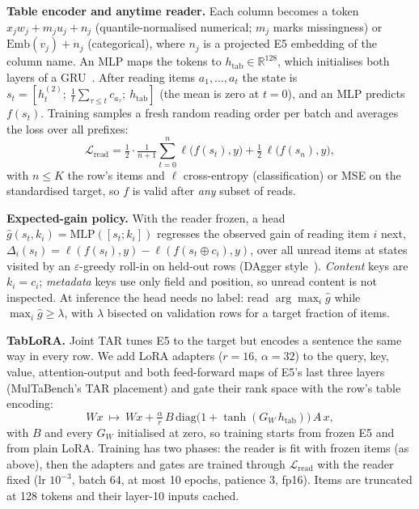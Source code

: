 \documentclass{article}
\newcommand{\htab}{h_{\mathrm{tab}}}
\begin{document}
\textbf{Table encoder and anytime reader.}
Each column becomes a token $x_jw_j+m_ju_j+n_j$ (quantile-normalised numerical; $m_j$ marks missingness) or $\mathrm{Emb}(v_j)+n_j$ (categorical), where $n_j$ is a projected E5 embedding of the column name.
An MLP maps the tokens to $\htab\in\mathbb{R}^{128}$, which initialises both layers of a GRU~\cite{cho2014gru}.
After reading items $a_1,\dots,a_t$ the state is $s_t=[h^{(2)}_t;\ \tfrac1t\sum_{\tau\le t}c_{a_\tau};\ \htab]$ (the mean is zero at $t=0$), and an MLP predicts $f(s_t)$.
Training samples a fresh random reading order per batch and averages the loss over all prefixes:
\begin{equation}
\mathcal{L}_{\text{read}}=\tfrac12\cdot\tfrac{1}{n+1}\textstyle\sum_{t=0}^{n}\ell\big(f(s_t),y\big)+\tfrac12\,\ell\big(f(s_n),y\big),
\end{equation}
with $n\le K$ the row's items and $\ell$ cross-entropy (classification) or MSE on the standardised target, so $f$ is valid after \emph{any} subset of reads.

\textbf{Expected-gain policy.}
With the reader frozen, a head $\hat g(s_t,k_i)=\mathrm{MLP}([s_t;k_i])$ regresses the observed gain of reading item $i$ next, $\Delta_i(s_t)=\ell(f(s_t),y)-\ell(f(s_t\oplus c_i),y)$, over all unread items at states visited by an $\varepsilon$-greedy roll-in on held-out rows (DAgger style~\cite{ross2011dagger}).
\emph{Content} keys are $k_i=c_i$; \emph{metadata} keys use only field and position, so unread content is not inspected.
At inference the head needs no label: read $\arg\max_i\hat g$ while $\max_i\hat g\ge\lambda$, with $\lambda$ bisected on validation rows for a target fraction of items.

\textbf{TabLoRA.}
Joint TAR tunes E5 to the target but encodes a sentence the same way in every row.
We add LoRA adapters ($r=16$, $\alpha=32$) to the query, key, value, attention-output and both feed-forward maps of E5's last three layers (MulTaBench's TAR placement) and gate their rank space with the row's table encoding:
\begin{equation}
W x\ \mapsto\ W x+\tfrac{\alpha}{r}\,B\,\mathrm{diag}\big(1+\tanh(G_W\,\htab)\big)\,A\,x ,
\end{equation}
with $B$ and every $G_W$ initialised at zero, so training starts from frozen E5 and from plain LoRA.
Training has two phases: the reader is fit with frozen items (as above), then the adapters and gates are trained through $\mathcal{L}_{\text{read}}$ with the reader fixed (lr $10^{-3}$, batch 64, at most 10 epochs, patience 3, fp16).
Items are truncated at 128 tokens and their layer-10 inputs cached.
\end{document}
